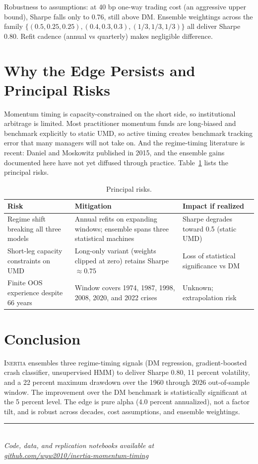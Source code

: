 \documentclass[12pt]{article}
\newcommand{\fundname}{\textsc{Inertia}}
\begin{document}
Robustness to assumptions: at 40 bp one-way trading cost (an aggressive upper bound), Sharpe
falls only to 0.76, still above DM. Ensemble weightings across the family $\{(0.5,0.25,0.25),
(0.4,0.3,0.3), (1/3,1/3,1/3)\}$ all deliver Sharpe 0.80. Refit cadence (annual vs quarterly)
makes negligible difference.

\section{Why the Edge Persists and Principal Risks}

Momentum timing is capacity-constrained on the short side, so institutional arbitrage is
limited. Most practitioner momentum funds are long-biased and benchmark explicitly to static
UMD, so active timing creates benchmark tracking error that many managers will not take on.
And the regime-timing literature is recent: Daniel and Moskowitz published in 2015, and the
ensemble gains documented here have not yet diffused through practice. Table~\ref{tab:risks}
lists the principal risks.

\begin{table}[H]
\centering
\small
\caption{Principal risks.}
\label{tab:risks}
\begin{tabular}{@{}>{\raggedright\arraybackslash}p{}
                  >{\raggedright\arraybackslash}p{}
                  >{\raggedright\arraybackslash}p{}@{}}
\toprule
Risk & Mitigation & Impact if realized \\
\midrule
Regime shift breaking all three models &
Annual refits on expanding windows; ensemble spans three statistical machines &
Sharpe degrades toward 0.5 (static UMD) \\
\addlinespace[3pt]
Short-leg capacity constraints on UMD &
Long-only variant (weights clipped at zero) retains Sharpe $\approx 0.75$ &
Loss of statistical significance vs DM \\
\addlinespace[3pt]
Finite OOS experience despite 66 years &
Window covers 1974, 1987, 1998, 2008, 2020, and 2022 crises &
Unknown; extrapolation risk \\
\bottomrule
\end{tabular}
\end{table}

\section{Conclusion}

\fundname{} ensembles three regime-timing signals (DM regression, gradient-boosted crash
classifier, unsupervised HMM) to deliver Sharpe 0.80, 11 percent volatility, and a 22 percent
maximum drawdown over the 1960 through 2026 out-of-sample window. The improvement over the
DM benchmark is statistically significant at the 5 percent level. The edge is pure alpha
(4.0 percent annualized), not a factor tilt, and is robust across decades, cost assumptions,
and ensemble weightings.

\vspace{1.2em}
\begin{center}
{\color{rulegrey}\rule{0.55\textwidth}{0.3pt}}\\[6pt]
\small\itshape
Code, data, and replication notebooks available at\\
\href{https://github.com/wyw2010/inertia-momentum-timing}{github.com/wyw2010/inertia-momentum-timing}
\end{center}
\end{document}
